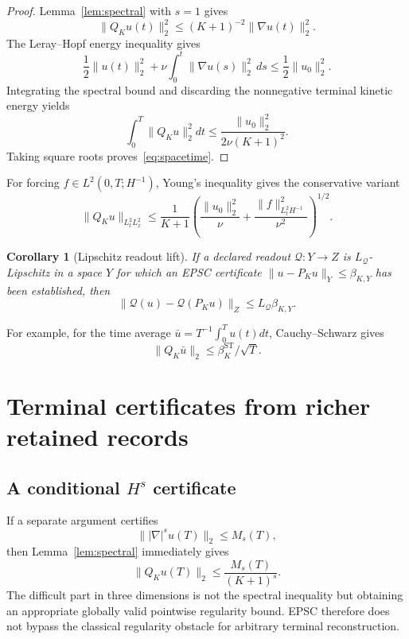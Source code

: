 \documentclass[11pt]{article}
\newtheorem{corollary}[theorem]{Corollary}
\theoremstyle{definition}
\begin{document}
\begin{proof}
Lemma~\ref{lem:spectral} with $s=1$ gives
\[
\|Q_Ku(t)\|_2^2\le (K+1)^{-2}\|\nabla u(t)\|_2^2.
\]
The Leray--Hopf energy inequality gives
\[
\frac12\|u(t)\|_2^2
+\nu\int_0^t\|\nabla u(s)\|_2^2\,ds
\le\frac12\|u_0\|_2^2.
\]
Integrating the spectral bound and discarding the nonnegative terminal kinetic energy yields
\[
\int_0^T\|Q_Ku\|_2^2dt
\le \frac{\|u_0\|_2^2}{2\nu(K+1)^2}.
\]
Taking square roots proves~\eqref{eq:spacetime}.
\end{proof}

For forcing $f\in L^2(0,T;H^{-1})$, Young's inequality gives the conservative variant
\begin{equation}\label{eq:forced}
\|Q_Ku\|_{L^2_tL^2_x}
\le
\frac{1}{K+1}
\left(
\frac{\|u_0\|_2^2}{\nu}
+\frac{\|f\|_{L^2_tH^{-1}}^2}{\nu^2}
\right)^{1/2}.
\end{equation}

\begin{corollary}[Lipschitz readout lift]\label{cor:lipschitz}
If a declared readout $\mathcal Q:Y\to Z$ is $L_{\mathcal Q}$-Lipschitz in a space $Y$ for which an
EPSC certificate $\|u-P_Ku\|_Y\le\beta_{K,Y}$ has been established, then
\[
\|\mathcal Q(u)-\mathcal Q(P_Ku)\|_Z
\le L_{\mathcal Q}\beta_{K,Y}.
\]
\end{corollary}

For example, for the time average $\bar u=T^{-1}\int_0^T u(t)dt$,
Cauchy--Schwarz gives
\[
\|Q_K\bar u\|_2\le \beta_K^{\mathrm{ST}}/\sqrt T.
\]

\section{Terminal certificates from richer retained records}

\subsection{A conditional $H^s$ certificate}

If a separate argument certifies
\[
\||\nabla|^su(T)\|_2\le M_s(T),
\]
then Lemma~\ref{lem:spectral} immediately gives
\begin{equation}\label{eq:terminalHs}
\boxed{
\|Q_Ku(T)\|_2\le\frac{M_s(T)}{(K+1)^s}.
}
\end{equation}
The difficult part in three dimensions is not the spectral inequality but obtaining an appropriate
globally valid pointwise regularity bound.  EPSC therefore does not bypass the classical regularity
obstacle for arbitrary terminal reconstruction.
\end{document}
